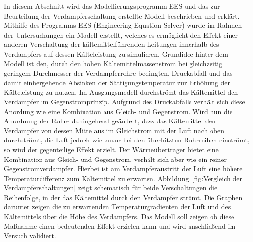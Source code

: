 In diesem Abschnitt wird das Modellierungsprogramm EES und das zur Beurteilung der Verdampferschaltung erstellte Modell beschrieben und erklärt.
Mithilfe des Programms EES (Engineering Equation Solver) wurde im Rahmen der Untersuchungen ein Modell erstellt, welches es ermöglicht den Effekt einer anderen Verschaltung der kältemittelführenden Leitungen innerhalb des Verdampfers auf dessen Kälteleistung zu simulieren. Grundidee hinter dem Modell ist den, durch den hohen Kältemittelmassenstrom bei gleichzeitig geringem Durchmesser der Verdampferrohre bedingten, Druckabfall und das damit einhergehende Absinken der Sättigungstemperatur zur Erhöhung der Kälteleistung zu nutzen. Im Ausgangsmodell durchströmt das Kältemittel den Verdampfer im Gegenstromprinzip. Aufgrund des Druckabfalls verhält sich diese Anordung wie eine Kombination aus Gleich- und Gegenstrom. Wird nun die Anordnung der Rohre dahingehend geändert, dass das Kältemittel den Verdampfer von dessen Mitte aus im Gleichstrom mit der Luft nach oben durchströmt, die Luft jedoch wie zuvor bei den überhitzten Rohrreihen einströmt, so wird der gegenteilige Effekt erzielt. Der Wärmeübertrager bietet eine Kombination aus Gleich- und Gegenstrom, verhält sich aber wie ein reiner Gegenstromverdampfer. Hierbei ist am Verdampferaustritt der Luft eine höhere Temperaturdifferenz zum Kältemittel zu erwarten. Abbildung~\ref{fig:Vergleich der Verdampferschaltungen} zeigt schematisch für beide Verschaltungen die Reihenfolge, in der das Kältemittel durch den Verdampfer strömt. Die Graphen darunter zeigen die zu erwartenden Temperaturgradienten der Luft und des Kältemittels über die Höhe des Verdampfers. \newline
Das Modell soll zeigen ob diese Maßnahme einen bedeutenden Effekt erzielen kann und wird anschließend im Versuch validiert.


